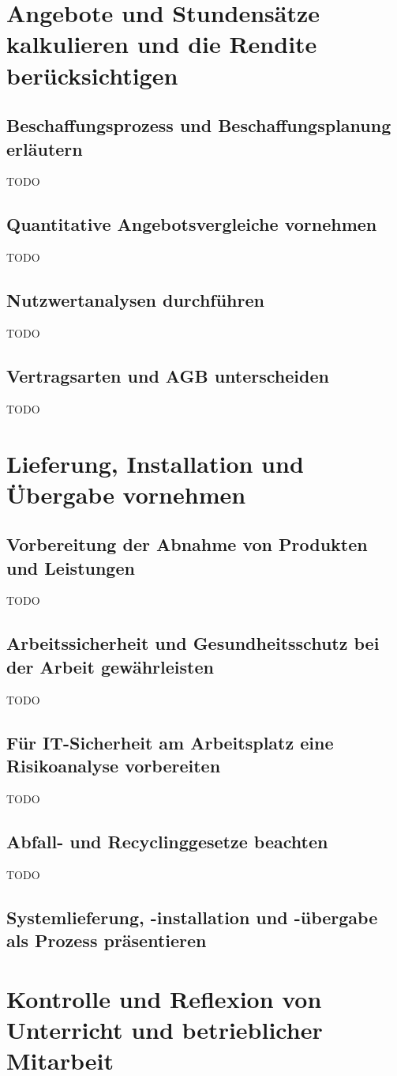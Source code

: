 \documentclass[11pt]{article}
\begin{document}
\newpage
\section{Angebote und Stundensätze kalkulieren und die Rendite berücksichtigen}
\subsection{Beschaffungsprozess und Beschaffungsplanung erläutern}
    TODO
\subsection{Quantitative Angebotsvergleiche vornehmen}
    TODO
\subsection{Nutzwertanalysen durchführen}
    TODO
\subsection{Vertragsarten und AGB unterscheiden}
    TODO

\newpage
\section{Lieferung, Installation und Übergabe vornehmen}
\subsection{Vorbereitung der Abnahme von Produkten und Leistungen}
    TODO
\subsection{Arbeitssicherheit und Gesundheitsschutz bei der Arbeit gewährleisten}
    TODO
\subsection{Für IT-Sicherheit am Arbeitsplatz eine Risikoanalyse vorbereiten}
    TODO
\subsection{Abfall- und Recyclinggesetze beachten}
    TODO
\subsection{Systemlieferung, -installation und -übergabe als Prozess präsentieren}

\newpage
\section{Kontrolle und Reflexion von Unterricht und betrieblicher Mitarbeit}
\end{document}

